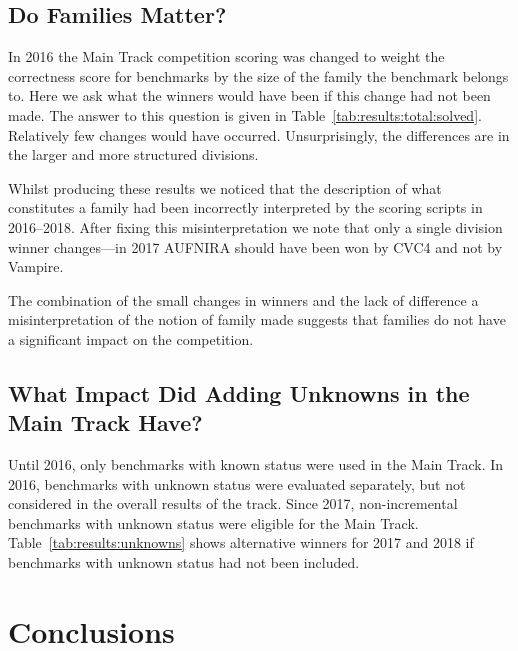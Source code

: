 \documentclass[dvipsnames,table,twoside,11pt]{article}
\newcommand{\maintrack}{Main Track\xspace}
\begin{document}


\subsection{Do Families Matter?}

In 2016 the \maintrack competition scoring was changed to weight the correctness score for benchmarks by the size of the family the benchmark belongs to. Here we ask what the winners would have been if this change had not been made. The answer to this question is given in Table~\ref{tab:results:total:solved}. Relatively few changes would have occurred. Unsurprisingly, the differences are in the larger and more structured divisions.

Whilst producing these results we noticed that the description of what constitutes a family had been incorrectly interpreted by the scoring scripts in 2016--2018. After fixing this misinterpretation we note that only a single division winner changes---in 2017 AUFNIRA should have been won by CVC4 and not by Vampire.

The combination of the small changes in winners and the lack of difference a misinterpretation of the notion of family made suggests that families do not have a significant impact on the competition.


\subsection{What Impact Did Adding Unknowns in the \maintrack Have?}

Until 2016, only benchmarks with known status were used in the \maintrack. In
2016, benchmarks with unknown status were evaluated separately, but not
considered in the overall results of the track.  Since 2017, non-incremental
benchmarks with unknown status were eligible for the \maintrack.
Table~\ref{tab:results:unknowns} shows alternative winners for 2017 and 2018 if
benchmarks with unknown status had not been included.





\section{Conclusions}
\label{sec:conclusions}
\end{document}
